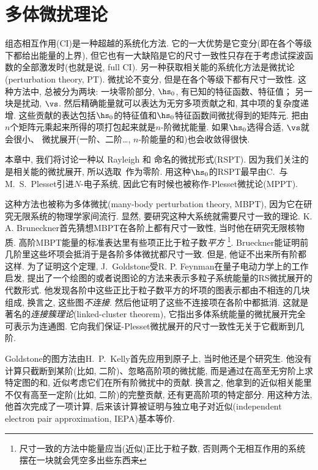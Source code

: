 \chapter{多体微扰理论}
\label{ch:6}
组态相互作用(CI)是一种超越\hft 的系统化方法.
它的一大优势是它变分(即在各个等级下都给出能量的上界),
但它也有一大缺陷是它的尺寸一致性只存在于考虑试探波函数的全部激发时(也就是说,
full CI).
另一种获取相关能的系统化方法是微扰论(perturbation theory, PT).
微扰论不变分, 但是在各个等级下都有尺寸一致性.
这种方法中, 总\ha 被分为两块:
一块零阶部分, $\hs _0$, 有已知的特征函数、特征值；
另一块是扰动, $\vs$.
然后精确能量就可以表达为无穷多项贡献之和, 其中项的复杂度递增.
这些贡献的表达包括$\hs _0$的特征值和$\hs _0$特征函数间微扰得到的矩阵元.
把由$n$个矩阵元乘起来所得的项打包起来就是$n$-阶微扰能量.
如果$\hs _0$选得合适, $\vs$就会很小、
微扰展开(一阶、二阶\ldots, $n$-阶能量的和)也会收敛得很快.

本章中, 我们将讨论一种以 Rayleigh 和 \sch 命名的微扰形式(RSPT).
因为我们关注的是相关能的微扰展开,
所以选取\hft~\ha 作为零阶\ha .
用这种$\hs _0$的RSPT最早由C.~\mo 与M.~S.~Plesset引进$N$-电子系统,
因此它有时候也被称作\mo -Plesset微扰论(MPPT).

这种方法也被称为多体微扰(many-body perturbation theory, MBPT),
因为它在研究无限系统的物理学家间流行.
显然, 要研究这种大系统就需要尺寸一致的理论.
K. A. Bruneckner首先猜想MBPT在各阶上都有尺寸一致性,
当时他在研究无限核物质.
高阶MBPT能量的标准表达里有些项正比于粒子数\textit{平方} \footnote{
尺寸一致的方法中能量应当(近似)正比于粒子数,
否则两个无相互作用的系统摆在一块就会凭空多出些东西来}.
Brueckner能证明前几阶里这些坏项会抵消于是各阶多体微扰都尺寸一致.
但是, 他证不出来所有阶都这样.
为了证明这个定理, J.~Goldstone受R. P. Feynman在量子电动力学上的工作启发,
提出了一个绘图的或者说图论的方法来表示多粒子系统能量的RS微扰展开的代数形式.
他发现各阶中这些正比于粒子数平方的坏项的图表示都由不相连的几块组成,
换言之, 这些图\textit{不连接}.
然后他证明了这些不连接项在各阶中都抵消.
这就是著名的\textit{连接簇理论}(linked-cluster theorem),
它指出多体系统能量的微扰展开完全可表示为连通图.
它向我们保证\mo -Plesset微扰展开的尺寸一致性无关于它截断到几阶.

Goldstone的图方法由H.~P.~Kelly首先应用到原子上, 当时他还是个研究生.
他没有计算只截断到某阶(比如, 二阶)、忽略高阶项的微扰能,
而是通过在高至无穷阶上求特定图的和, 近似考虑它们在所有阶微扰中的贡献.
换言之, 他拿到的近似相关能里不仅有高至一定阶(比如, 二阶)的完整贡献,
还有更高阶项的特定部分.
用这种方法, 他首次完成了一项计算,
后来该计算被证明与独立电子对近似(independent electron pair approximation,
IEPA)基本等价.

